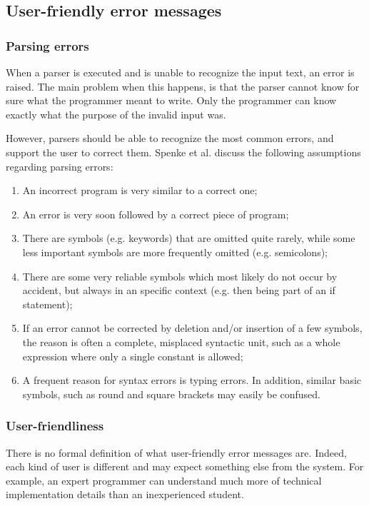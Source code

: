 
\subsection{User-friendly error messages}
\label{parsing:errors}

\subsubsection{Parsing errors}
When a parser is executed and is unable to recognize the input text, an error is raised.
The main problem when this happens, is that the parser cannot know for sure what the programmer meant to write.
Only the programmer can know exactly what the purpose of the invalid input was.

However, parsers should be able to recognize the most common errors, and support the user to correct them.
Spenke et al.  discuss the following assumptions regarding parsing errors:
\begin{enumerate}
	\item An incorrect program is very similar to a correct one;
	\item An error is very soon followed by a correct piece of program;
	\item There are symbols (e.g. keywords) that are omitted quite rarely, while some less important symbols are more frequently omitted (e.g. semicolons);
	\item There are some very reliable symbols which most likely do not occur by accident, but always in an specific context (e.g. then being part of an if statement);
	\item  If an error cannot be corrected by deletion and/or insertion of a few symbols, the reason is often a complete, misplaced syntactic unit, such as a whole expression where only a single constant is allowed;
	\item A frequent reason for syntax errors is typing errors. In addition, similar basic symbols, such as round and square brackets may easily be confused.
\end{enumerate}

\subsubsection{User-friendliness}
There is no formal definition of what user-friendly error messages are.
Indeed, each kind of user is different and may expect something else from the system.
For example, an expert programmer can understand much more of technical implementation details than an inexperienced student.

